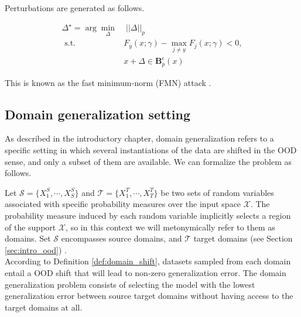 \begin{attack}[FMN]
    Perturbations are generated as follows.
    
    $$
        \begin{aligned}
            \Delta^\star = \arg \min_\Delta & \; ||\Delta||_p \\
            \text { s.t. } & F_y(x; \gamma)- \max_{j \neq y} F_j(x; \gamma) < 0, \\
            & x + \Delta \in \mathbf{B}_p^\epsilon(x)
        \end{aligned}
    $$

    This is known as the fast minimum-norm (FMN) attack
    \cite{pintorFastMinimumnormAdversarial2021}.
\end{attack}


\subsection{Domain generalization setting}

As described in the introductory chapter, domain generalization
refers to a specific setting in which several instantiations of
the data are shifted in the OOD sense, and only a subset of them
are available. We can formalize the problem as follows.

\begin{definition}
    Let $\mathcal{S} = \{X^S_1, \cdots, X^S_S\}$ and $\mathcal{T} = \{X^T_1, \cdots, X^T_T\}$ 
    be two sets of random variables associated with specific probability measures 
    over the input space $\mathcal{X}$. The probability measure 
    induced by each random variable implicitly selects a region of
    the support $\mathcal{X}$, so in this context we will metonymically 
    refer to them as domains. Set $\mathcal{S}$ encompasses source domains,
    and $\mathcal{T}$ target domains (see Section \ref{sec:intro_ood})
    \cite{liuOutOfDistributionGeneralizationSurvey2023,wangGeneralizingUnseenDomains2022}. \\

    According to Definition \ref{def:domain_shift}, datasets sampled from each domain
    entail a OOD shift that will lead to non-zero generalization error. The 
    domain generalization problem consists of selecting the model with
    the lowest generalization error between source target domains without
    having access to the target domains at all. 
\end{definition}

